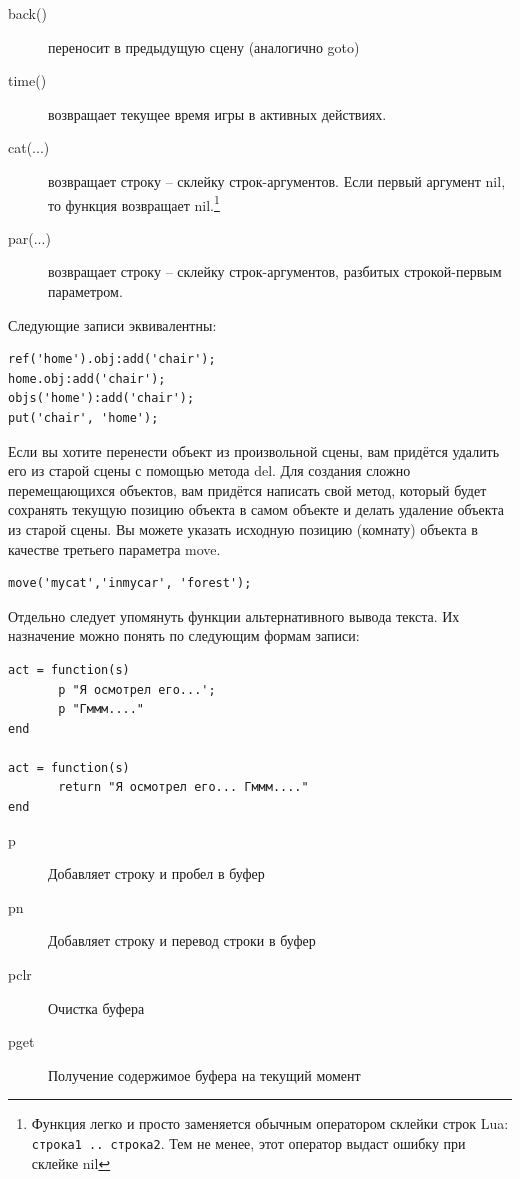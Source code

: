 \documentclass[a4paper,12pt]{article}
\begin{document}
\begin{description}
\item[back()]  переносит в предыдущую сцену (аналогично goto)
\item[time()]  возвращает текущее время игры в активных действиях.
\item[cat(...)]  возвращает строку -- склейку строк-аргументов. Если первый аргумент nil, то функция возвращает nil.\footnote{Функция легко и просто заменяется обычным оператором склейки строк Lua: \texttt{строка1 .. строка2}. Тем не менее, этот оператор выдаст ошибку при склейке nil}
\item[par(...)]  возвращает строку -- склейку строк-аргументов, разбитых строкой-первым параметром.
\end{description}

Следующие записи эквивалентны:

\begin{verbatim}
ref('home').obj:add('chair');
home.obj:add('chair');
objs('home'):add('chair');
put('chair', 'home');
\end{verbatim}

Если вы хотите перенести объект из произвольной сцены, вам придётся удалить его из старой сцены с помощью метода del. Для создания сложно перемещающихся объектов, вам придётся написать свой метод, который будет сохранять текущую позицию объекта в самом объекте и делать удаление объекта из старой сцены. Вы можете указать исходную позицию (комнату) объекта в качестве третьего параметра move.

\begin{verbatim}
move('mycat','inmycar', 'forest');
\end{verbatim}

Отдельно следует упомянуть функции альтернативного вывода текста. Их назначение можно понять по следующим формам записи:

\begin{verbatim}
act = function(s)
       p "Я осмотрел его...';
       p "Гммм...."
end

act = function(s)
       return "Я осмотрел его... Гммм...."
end
\end{verbatim}

\begin{description}
\item[p]  Добавляет строку и пробел в буфер
\item[pn]  Добавляет строку и перевод строки в буфер
\item[pclr]  Очистка буфера
\item[pget]  Получение содержимое буфера на текущий момент
\end{description}
\end{document}
